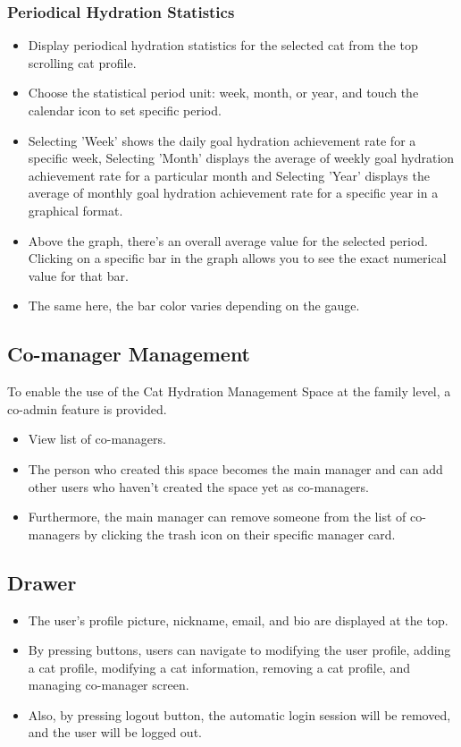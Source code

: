 \documentclass[conference]{IEEEtran}
\begin{document}
\subsubsection{Periodical Hydration Statistics}
\begin{itemize}
    \item Display periodical hydration statistics for the selected cat from the top scrolling cat profile.
    \item Choose the statistical period unit: week, month, or year, and touch the calendar icon to set specific period.
    \item Selecting 'Week' shows the daily goal hydration achievement rate for a specific week, Selecting 'Month' displays the average of weekly goal hydration achievement rate for a particular month and Selecting 'Year' displays the average of monthly goal hydration achievement rate for a specific year in a graphical format.
    \item Above the graph, there's an overall average value for the selected period. Clicking on a specific bar in the graph allows you to see the exact numerical value for that bar.
    \item The same here, the bar color varies depending on the gauge.\\
\end{itemize}

\subsection{Co-manager Management}
To enable the use of the Cat Hydration Management Space at the family level, a co-admin feature is provided.\newline
\begin{itemize}
    \item View list of co-managers.
    \item The person who created this space becomes the main manager and can add other users who haven't created the space yet as co-managers.
    \item Furthermore, the main manager can remove someone from the list of co-managers by clicking the trash icon on their specific manager card.\\
\end{itemize}

\subsection{Drawer}
\begin{itemize}
    \item The user's profile picture, nickname, email, and bio are displayed at the top.
    \item By pressing buttons, users can navigate to modifying the user profile, adding a cat profile, modifying a cat information, removing a cat profile, and managing co-manager screen.
    \item Also, by pressing logout button, the automatic login session will be removed, and the user will be logged out.\\
\end{itemize}
\end{document}
